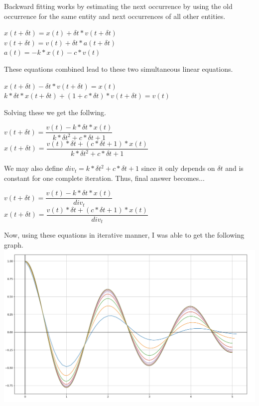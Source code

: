 \documentclass{article}
\begin{document}
        Backward fitting works by estimating the next occurrence by using the old occurrence for the same entity and next occurrences of all other entities.
                \begin{center}
                \(x(t+\delta t) = x(t) + \delta t*v(t + \delta t)\) \\
                \(v(t+\delta t) = v(t) + \delta t*a(t + \delta t)\) \\
                \(a(t) = - k*x(t) - c*v(t)\) \\
                \end{center}
        These equations combined lead to these two simultaneous linear equations.
                \begin{center}
                \(x(t+\delta t) - \delta t*v(t + \delta t) = x(t)\) \\
                \(k*\delta t*x(t+\delta t) + (1+c*\delta t)*v(t+\delta t) = v(t)\) \\
                \end{center}
        Solving these we get the follwing.
                \begin{center}
                \(v(t + \delta t) = \dfrac{v(t) - k*\delta t*x(t)}{k*\delta t^2 + c*\delta t + 1}\) \\[10pt]
                \(x(t+\delta t) = \dfrac{v(t)*\delta t + (c*\delta t + 1)*x(t)}{k*\delta t^2 + c*\delta t + 1}\) \\
                \end{center}
        We may also define  \(div_t = k*\delta t^2 + c*\delta t + 1\) since it only depends on \(\delta t\) and is constant for one complete iteration. Thus, final answer becomes...
        \begin{center}
            \(v(t + \delta t) = \dfrac{v(t) - k*\delta t*x(t)}{div_t}\) \\[10pt]
                \(x(t+\delta t) = \dfrac{v(t)*\delta t + (c*\delta t + 1)*x(t)}{div_t}\) \\
        \end{center}
        {\pagebreak}
        Now, using these equations in iterative manner, I was able to get the following graph. \\
        \includegraphics[scale=.25]{../Backward.png} \\
\end{document}
